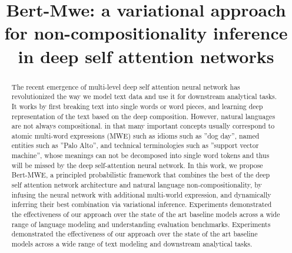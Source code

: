 \documentclass[conference]{IEEEtran}
\newcommand{\nop}[1]{}
\newcommand{\BertMWE}{\mbox{\sf Bert-MWE}\xspace}
\begin{document}
\title{
Bert-Mwe: a variational approach for non-compositionality inference in deep self attention networks
}

\nop{
\author{Keqian Li}
\affiliation{\institution{University of California at Santa Barbara}}
\email{{klee}@cs.ucsb.edu}

\renewcommand{\shortauthors}{K. Li et al.}
\renewcommand{\shorttitle}{UNEC}
}

\author{
}

\maketitle




\begin{abstract}
The recent emergence of multi-level deep self attention neural network has revolutionized the way we model text data and use it for downstream analytical tasks. 
It works by first breaking text into single words or word pieces, 
and learning deep representation of the text based on the deep composition.
However, natural languages are not always compositional.
in that many important concepts usually correspond to atomic multi-word  expressions (MWE) such as 
idioms such as ”dog day”, named entities such as ”Palo Alto”, and technical terminologies such as ”support vector machine”,
whose meanings can not be decomposed into single word tokens and thus will be missed by the deep self-attention neural network.
In this work, we propose \BertMWE, a principled probabilistic framework that combines the best of the deep self attention network architecture and natural language non-compositionality, 
by infusing the neural network with additional multi-world expression, and dynamically inferring their best combination via variational inference. Experiments demonstrated the effectiveness of our approach over the state of the art baseline models across a wide range of language modeling and understanding evaluation benchmarks. 
Experiments demonstrated the effectiveness of our approach over the state of the art baseline models across a wide range of text modeling and downstream analytical tasks.
\end{abstract}







\end{document}
